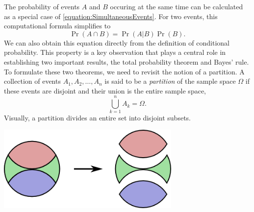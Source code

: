 The probability of events $A$ and $B$ occuring at the same time can be calculated as a special case of \eqref{equation:SimultaneousEvents}.
For two events, this computational formula simplifies to
\begin{equation} \label{equation:ProbabilityIntersection}
\Pr (A \cap B) = \Pr (A|B) \Pr (B) .
\end{equation}
We can also obtain this equation directly from the definition of conditional probability.
This property is a key observation that plays a central role in establishing two important results, the total probability theorem and Bayes' rule.
To formulate these two theorems, we need to revisit the notion of a partition.
A collection of events $A_1, A_2, \ldots, A_n$ is said to be a \emph{partition} of the sample space $\Omega$ if these events are disjoint and their union is the entire sample space,
\begin{equation*}
\bigcup_{k=1}^n A_k = \Omega .
\end{equation*}
Visually, a partition divides an entire set into disjoint subsets.
\begin{center}
\includegraphics[height=4.23cm]{Figures/3Chapter/setpartition2}
\end{center}

